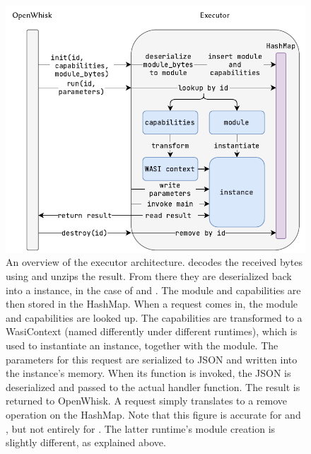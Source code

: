 \begin{figure}
    \includegraphics{figures/ExecutorOverview.pdf}
    \caption{An overview of the executor architecture.  decodes the received bytes using  and unzips the result. From there they are deserialized back into a  instance, in the case of  and . The module and capabilities are then stored in the HashMap. When a  request comes in, the module and capabilities are looked up. The capabilities are transformed to a WasiContext (named differently under different runtimes), which is used to instantiate an instance, together with the module. The parameters for this  request are serialized to JSON and written into the instance's memory. When its  function is invoked, the JSON is deserialized and passed to the actual handler function. The result is returned to OpenWhisk. A  request simply translates to a remove operation on the HashMap. Note that this figure is accurate for  and , but not entirely for . The latter runtime's module creation is slightly different, as explained above.}
    \label{fig:executor-overview}
\end{figure}

